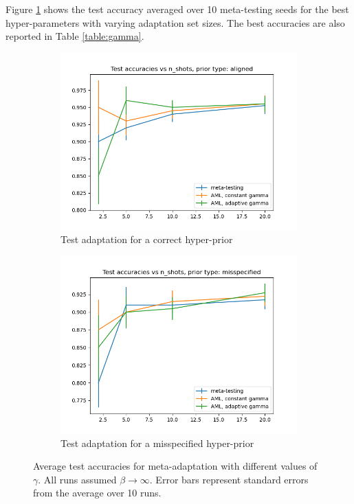 \documentclass{article}
\theoremstyle{definition}
\begin{document}
Figure \ref{fig:results-gamma} shows the test accuracy averaged over 10 meta-testing seeds for the best hyper-parameters with varying adaptation set sizes. The best accuracies are also reported in Table \ref{table:gamma}.


\begin{figure}[h!]
	\centering
	\begin{subfigure}[b]{0.49\textwidth}
		\centering
		\includegraphics[width=\textwidth]{test_accuracies_model_aligned}
		\caption{Test adaptation for a correct hyper-prior}
	\end{subfigure}
	\hfill
	\begin{subfigure}[b]{0.49\textwidth}
		\centering
		\includegraphics[width=\textwidth]{test_accuracies_model_misspecified}
		\caption{Test adaptation for a misspecified hyper-prior}	 	
	\end{subfigure}
	\hfill
	\caption{Average test accuracies for meta-adaptation with different values of $\gamma$. All runs assumed $\beta\rightarrow\infty$. Error bars represent standard errors from the average over 10 runs.}	 
	\label{fig:results-gamma}
\end{figure}
\end{document}
